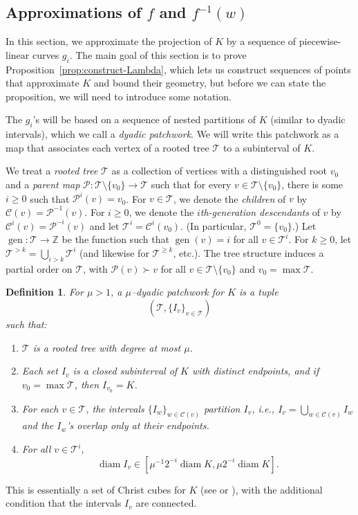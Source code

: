 \documentclass[12pt,reqno]{amsart}
\newcommand{\cC}{\mathcal{C}}
\newcommand{\cP}{\mathcal{P}}
\newcommand{\cT}{\mathcal{T}}
\DeclareMathOperator{\gen}{gen}
\newcommand{\Z}{\mathbb{Z}}
\newcommand{\from}{\colon}
\newtheorem{defn}[thm]{Definition}
\theoremstyle{remark}
\newcommand{\0}{\mathbf{0}}
\renewcommand{\1}{\mathbf 1}
\DeclareMathOperator{\diam}{diam}
\begin{document}
\subsection{Approximations of \texorpdfstring{$f$ and $f^{-1}(w)$}{f and f\^{}-1(w)}}\label{sec:approximations}
In this section, we approximate the projection of $K$ by a sequence of piecewise-linear curves $g_i$. The main goal of this section is to prove Proposition~\ref{prop:construct-Lambda}, which lets us construct sequences of points that approximate $K$ and bound their geometry, but before we can state the proposition, we will need to introduce some notation.

The $g_i$'s will be based on a sequence of nested partitions of $K$ (similar to dyadic intervals), which we call a \emph{dyadic patchwork}. We will write this patchwork as a map that associates each vertex of a rooted tree $\cT$ to a subinterval of $K$.

We treat a \emph{rooted tree} $\cT$ as a collection of vertices with a distinguished root $v_0$ and a \emph{parent map} $\cP\from \cT\setminus\{v_0\}\to \cT$ such that for every $v\in \cT\setminus\{v_0\}$, there is some $i\ge 0$ such that $\cP^i(v)=v_0$. For $v\in \cT$, we denote the \emph{children} of $v$ by $\cC(v)=\cP^{-1}(v)$. For $i\ge 0$, we denote the \emph{$i$th-generation descendants} of $v$ by $\cC^i(v)= \cP^{-i}(v)$ and let $\cT^i=\cC^i(v_0)$. (In particular, $\cT^0=\{v_0\}$.) Let $\gen\from \cT\to \Z$ be the function such that $\gen(v) = i$ for all $v\in \cT^i$. For $k\ge 0$, let $\cT^{>k} = \bigcup_{i>k}\cT^i$ (and likewise for $\cT^{\ge k}$, etc.).
The tree structure induces a partial order on $\cT$, with $\cP(v)\succ v$ for all $v\in \cT\setminus\{v_0\}$ and $v_0=\max \cT$.

\begin{defn}\label{def:patchwork}
For $\mu > 1$, a \emph{$\mu$--dyadic patchwork} for $K$ is a tuple $$(\cT, \{I_v\}_{v\in \cT})$$ such that:
\begin{enumerate}
\item $\cT$ is a rooted tree with degree at most $\mu$.
\item Each set $I_v$ is a closed subinterval of $K$ with distinct endpoints, and if $v_0=\max \cT$, then $I_{v_0} = K$.
\item For each $v\in \cT$, the intervals $\{I_w\}_{w\in \cC(v)}$ partition $I_v$, i.e., $I_v=\bigcup_{w\in \cC(v)} I_w$ and the $I_w$'s overlap only at their endpoints.
\item For all $v\in \cT^i$,
  \begin{equation}\label{eq:patch-diam}
    \diam I_v\in [\mu^{-1} 2^{-i}\diam K, \mu 2^{-i}\diam K].
  \end{equation}
\end{enumerate}
\end{defn}
This is essentially a set of Christ cubes for $K$ (see \cite[Sec.\ 3]{ChristA-Tb-Theorem} or \cite[Appendix I]{DavidWaveletsAndSingular}), with the additional condition that the intervals $I_v$ are connected. 
\end{document}
